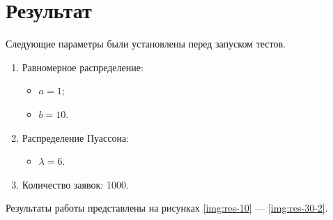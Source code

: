 \chapter{Результат}

Следующие параметры были установлены перед запуском тестов.
\begin{enumerate}
	\item Равномерное распределение:
	\begin{itemize}
		\item $ a = 1 $;
		\item $ b = 10 $.
	\end{itemize}
	\item Распределение Пуассона:
	\begin{itemize}
		\item $ \lambda = 6 $.
	\end{itemize}
	\item Количество заявок: 1000.
\end{enumerate}

Результаты работы представлены на рисунках \ref{img:res-10} --- \ref{img:res-30-2}.




\clearpage
{}

